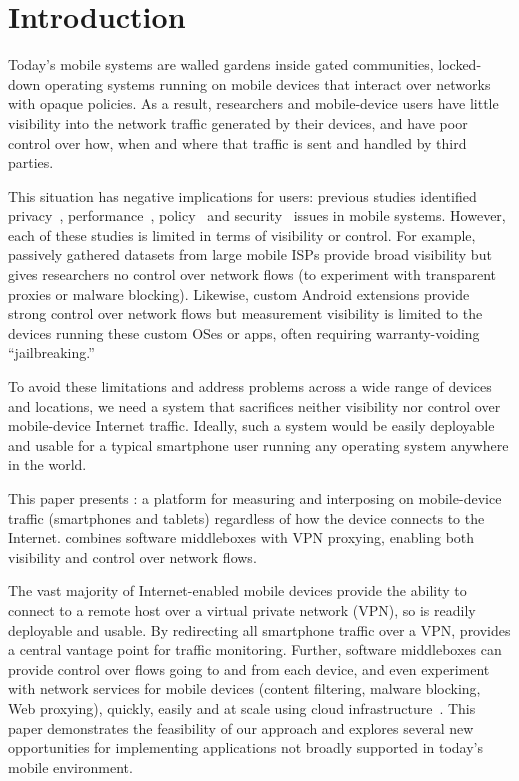 \section{Introduction}
\label{sec:introduction}

Today's mobile systems are walled gardens inside gated communities, \ie{} locked-down operating systems 
running on mobile devices that interact over networks with opaque policies. As a result, 
researchers and mobile-device users have little visibility into the network traffic generated by 
their devices, and have poor control over how, when and where that traffic is sent and handled by third parties. 

This situation has negative implications for users: previous studies  
identified privacy~\cite{vallina-rod:ads}, performance~\cite{gerber:passivespeed,chen:wifi,sommers:cellwifi}, policy~\cite{wang:middleboxes} and security~\cite{enck:taintdroid} issues in mobile systems. However, each of these studies 
is limited in terms of visibility or control. 
For example, passively gathered datasets from large mobile 
ISPs provide broad visibility but gives researchers no control over network flows (\eg to experiment with 
transparent proxies or malware blocking). Likewise, custom Android extensions provide 
strong control over network flows but measurement visibility is limited to the devices running these 
custom OSes or apps, often requiring warranty-voiding ``jailbreaking.'' 

To avoid these limitations and address problems across a wide range of devices and locations, 
we need a system that sacrifices neither visibility nor control over mobile-device Internet traffic.
Ideally, such a system would be easily deployable and usable for a typical smartphone user 
running any operating system anywhere in the world.

This paper presents \meddle:  a platform for measuring and interposing on mobile-device traffic (\eg smartphones and tablets) 
regardless of how the device connects to the Internet. \meddle combines software middleboxes 
with VPN proxying, enabling both visibility and control over network flows. 

The vast majority of Internet-enabled mobile devices provide the ability to connect to a remote host over a virtual private network (VPN), so \meddle is readily deployable and usable. 
By redirecting all smartphone traffic over a VPN, \meddle provides a central vantage point for traffic monitoring.
Further, software middleboxes can provide control over flows going to and from each device, and even experiment with network services for mobile devices (\eg content filtering, malware blocking, Web proxying), quickly, easily and at scale using cloud infrastructure~\cite{sherry:middleboxes}. 
This paper demonstrates the feasibility of our approach and explores several new opportunities 
for implementing applications not broadly supported in today's mobile 
environment. 

